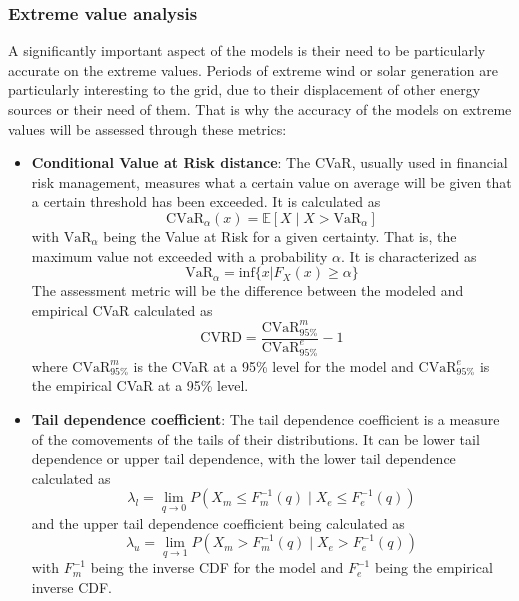 \subsubsection{Extreme value analysis}
A significantly important aspect of the models is their need to be particularly accurate on the extreme values. Periods of extreme wind or solar generation are particularly interesting to the grid, due to their displacement of other energy sources or their need of them. That is why the accuracy of the models on extreme values will be assessed through these metrics:
\begin{itemize}
    \item \textbf{Conditional Value at Risk distance}: The CVaR, usually used in financial risk management, measures what a certain value on average will be given that a certain threshold has been exceeded. It is calculated as 
    \begin{equation}
        \text{CVaR}_{\alpha}(x) = \mathbb{E} \left[X\mid X>\text{VaR}_{\alpha}\right]
    \end{equation} 
    with $\text{VaR}_{\alpha}$ being the Value at Risk for a given certainty. That is, the maximum value not exceeded with a probability $\alpha$. It is characterized as 
    \begin{equation}
        \text{VaR}_{\alpha}=\text{inf}\{x|F_X(x)\geq\alpha\}
    \end{equation}
    The assessment metric will be the difference between the modeled and empirical CVaR calculated as 
    \begin{equation}
        \text{CVRD}=\frac{\text{CVaR}^m_{95\%}}{\text{CVaR}^e_{95\%}}-1
    \end{equation}
    where $\text{CVaR}^m_{95\%}$ is the CVaR at a 95\% level for the model and $\text{CVaR}^e_{95\%}$ is the empirical CVaR at a 95\% level.
    \item \textbf{Tail dependence coefficient}: The tail dependence coefficient is a measure of the comovements of the tails of their distributions. It can be lower tail dependence or upper tail dependence, with the lower tail dependence calculated as 
    \begin{equation}
        \lambda_l=\lim_{q \to 0} P\left(X_m \leq F^{-1}_m(q) \mid X_e \leq F^{-1}_e(q)\right)  
    \end{equation}
    and the upper tail dependence coefficient being calculated as 
    \begin{equation}
        \lambda_u=\lim_{q \to 1} P\left(X_m > F^{-1}_m(q) \mid X_e > F^{-1}_e(q)\right)  
    \end{equation}
    with $F^{-1}_m$ being the inverse CDF for the model and $F^{-1}_e$ being the empirical inverse CDF.


\end{itemize}
